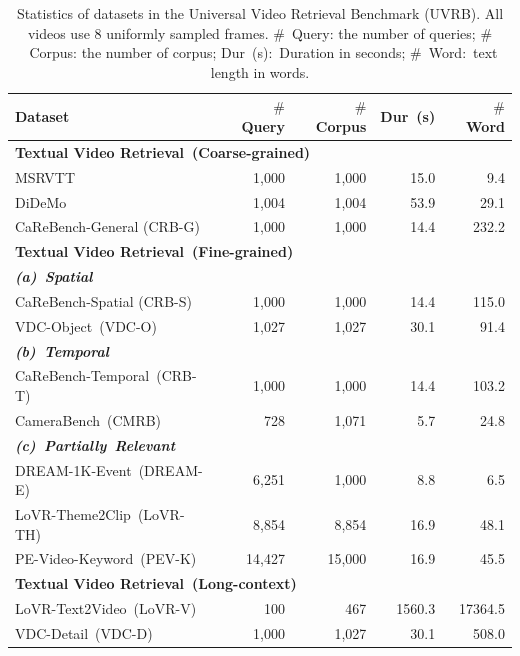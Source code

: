 \begin{table}[t]
\centering
\caption{Statistics of datasets in the Universal Video Retrieval Benchmark (UVRB). All videos use 8 uniformly sampled frames. $\#$~Query: the number of queries; $\#$~Corpus: the number of corpus; Dur~(s):~Duration in seconds; $\#$~Word:~text length in words.}
\label{gve:tab:uvrb_dataset}
\begin{tabular}{l r r r r}
\toprule
\textbf{Dataset} & \textbf{$\#$~Query} & \textbf{$\#$~Corpus} & \textbf{Dur~(s)} & \textbf{$\#$~Word} \\
\midrule
\multicolumn{5}{l}{\textbf{Textual Video Retrieval~(Coarse-grained)}} \\
MSRVTT~\cite{xu2016msr} & 1,000 & 1,000 & 15.0 & 9.4 \\
DiDeMo~\cite{anne2017localizing} & 1,004 & 1,004 & 53.9 & 29.1 \\
CaReBench-General (CRB-G)~\cite{xu2025carebench} & 1,000 & 1,000 & 14.4 & 232.2 \\
\midrule
\multicolumn{5}{l}{\textbf{Textual Video Retrieval~(Fine-grained)}} \\
\multicolumn{5}{l}{\textbf{\textit{(a)~Spatial}}} \\
CaReBench-Spatial (CRB-S)~\cite{xu2025carebench} & 1,000 & 1,000 & 14.4 & 115.0 \\
VDC-Object~(VDC-O)~\cite{chai2024auroracap} & 1,027 & 1,027 & 30.1 & 91.4 \\
\multicolumn{5}{l}{\textbf{\textit{(b)~Temporal}}} \\
CaReBench-Temporal~(CRB-T)~\cite{xu2025carebench} & 1,000 & 1,000 & 14.4 & 103.2 \\
CameraBench~(CMRB)~\cite{lin2025towards} & 728 & 1,071 & 5.7 & 24.8 \\
\multicolumn{5}{l}{\textbf{\textit{(c)~Partially~Relevant}}} \\
DREAM-1K-Event~(DREAM-E)~\cite{wang2024tarsier} & 6,251 & 1,000 & 8.8 & 6.5 \\
LoVR-Theme2Clip~(LoVR-TH)~\cite{cai2025lovr} & 8,854 & 8,854 & 16.9 & 48.1 \\
PE-Video-Keyword~(PEV-K)~\cite{bolya2025perception} & 14,427 & 15,000 & 16.9 & 45.5 \\
\midrule
\multicolumn{5}{l}{\textbf{Textual Video Retrieval~(Long-context)}} \\
LoVR-Text2Video~(LoVR-V)~\cite{cai2025lovr} & 100 & 467 & 1560.3 & 17364.5 \\
VDC-Detail~(VDC-D)~\cite{chai2024auroracap} & 1,000 & 1,027 & 30.1 & 508.0 \\

\end{tabular}
\end{table}
